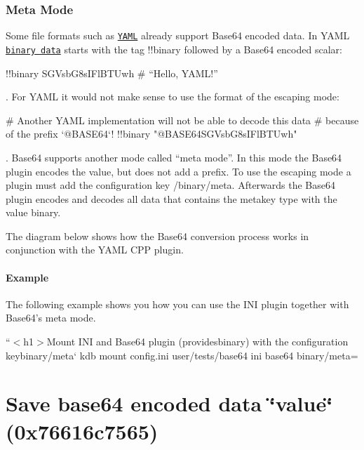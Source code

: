 \subsubsection*{Meta Mode}

Some file formats such as \href{http://yaml.org}{\tt Y\+A\+ML} already support Base64 encoded data. In Y\+A\+ML \href{http://yaml.org/type/binary.html}{\tt binary data} starts with the tag {\ttfamily !!binary} followed by a Base64 encoded scalar\+:


\begin{DoxyCode}
!!binary SGVsbG8sIFlBTUwh # “Hello, YAML!”
\end{DoxyCode}


. For Y\+A\+ML it would not make sense to use the format of the escaping mode\+:


\begin{DoxyCode}
# Another YAML implementation will not be able to decode this data
# because of the prefix `@BASE64`!
!!binary "@BASE64SGVsbG8sIFlBTUwh"
\end{DoxyCode}


. Base64 supports another mode called “meta mode”. In this mode the Base64 plugin encodes the value, but does not add a prefix. To use the escaping mode a plugin must add the configuration key {\ttfamily /binary/meta}. Afterwards the Base64 plugin encodes and decodes all data that contains the metakey {\ttfamily type} with the value {\ttfamily binary}.

The diagram below shows how the Base64 conversion process works in conjunction with the Y\+A\+ML C\+PP plugin.



\paragraph*{Example}

The following example shows you how you can use the I\+NI plugin together with Base64’s meta mode.

``{\ttfamily  $<$h1$>$Mount I\+NI and Base64 plugin (provides}binary{\ttfamily ) with the configuration key}binary/meta` kdb mount config.\+ini user/tests/base64 ini base64 binary/meta=

\section*{Save base64 encoded data {\ttfamily \char`\"{}value\char`\"{}} ({\ttfamily 0x76616c7565})}

